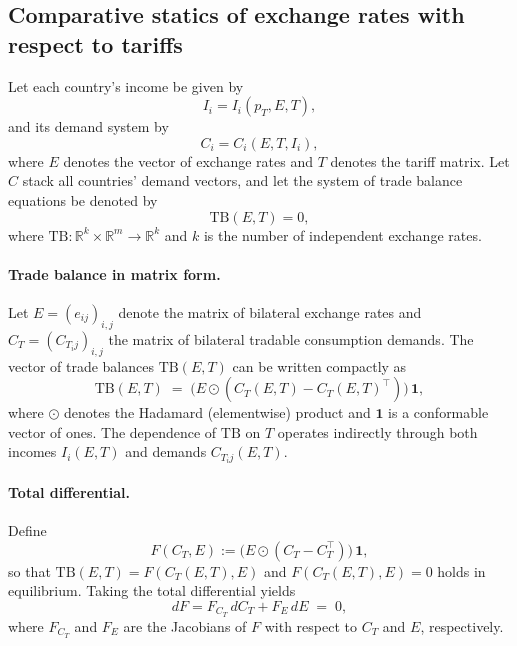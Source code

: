 \documentclass[11pt]{article}
\begin{document}
\subsection*{Comparative statics of exchange rates with respect to tariffs}

Let each country’s income be given by
\begin{equation}
    I_i = I_i(p_T, E, T),
\end{equation}
and its demand system by
\begin{equation}
    C_i = C_i(E, T, I_i),
\end{equation}
where $E$ denotes the vector of exchange rates and $T$ denotes the tariff 
matrix. Let $C$ stack all countries’ demand vectors, and let the system of 
trade balance equations be denoted by
\begin{equation}
    \mathrm{TB}(E, T) = 0,
\end{equation}
where $\mathrm{TB}:\mathbb{R}^k \times \mathbb{R}^m \to \mathbb{R}^k$ and $k$ 
is the number of independent exchange rates.

\paragraph{Trade balance in matrix form.}
Let $E = (e_{ij})_{i,j}$ denote the matrix of bilateral exchange rates and 
$C_T = (C_{T_i j})_{i,j}$ the matrix of bilateral tradable consumption demands. 
The vector of trade balances $\mathrm{TB}(E,T)$ can be written compactly as
\begin{equation}
    \mathrm{TB}(E,T)
    \;=\;
    \big( E \odot ( C_T(E,T) - C_T(E,T)^\top ) \big)\,\mathbf{1},
    \label{eq:TB_matrix_rep}
\end{equation}
where $\odot$ denotes the Hadamard (elementwise) product and $\mathbf{1}$ 
is a conformable vector of ones.  The dependence of $\mathrm{TB}$ on $T$ 
operates indirectly through both incomes $I_i(E,T)$ and demands 
$C_{T_i j}(E,T)$.

\paragraph{Total differential.}
Define
\[
    F(C_T,E) := \big(E \odot (C_T - C_T^\top)\big)\,\mathbf{1},
\]
so that $\mathrm{TB}(E,T)=F(C_T(E,T),E)$ and $F(C_T(E,T),E)=0$ holds in
equilibrium. Taking the total differential yields
\begin{equation}
    dF 
    = 
    F_{C_T} \, dC_T
    + 
    F_E \, dE
    \;=\;
    0,
    \label{eq:total_diff_base}
\end{equation}
where $F_{C_T}$ and $F_E$ are the Jacobians of $F$ with respect to 
$C_T$ and $E$, respectively.
\end{document}
